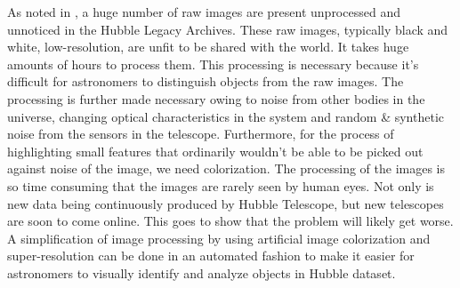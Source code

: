 \documentclass[10pt,twocolumn,letterpaper]{article}
\begin{document}
\hspace*{0.167 in}As noted in \cite{Gao2019astronomical}, a huge number of raw images are present unprocessed and unnoticed in the Hubble Legacy Archives. These raw images, typically black and white, low-resolution, are unfit to be shared with the world. It takes huge amounts of hours to process them. This processing is necessary because it's difficult for astronomers to distinguish objects from the raw images. The processing is further made necessary owing to noise from other bodies in the universe, changing optical characteristics in the system and random \& synthetic noise from the sensors in the telescope. Furthermore, for the process of highlighting small features that ordinarily wouldn't be able to be picked out against noise of the image, we need colorization. The processing of the images is so time consuming that the images are rarely seen by human eyes. Not only is new data being continuously produced by Hubble Telescope, but new telescopes are soon to come online. This goes to show that the problem will likely get worse. A simplification of image processing by using artificial image colorization and super-resolution can be done in an automated fashion to make it easier for astronomers to visually identify and analyze objects in Hubble dataset.
\end{document}
